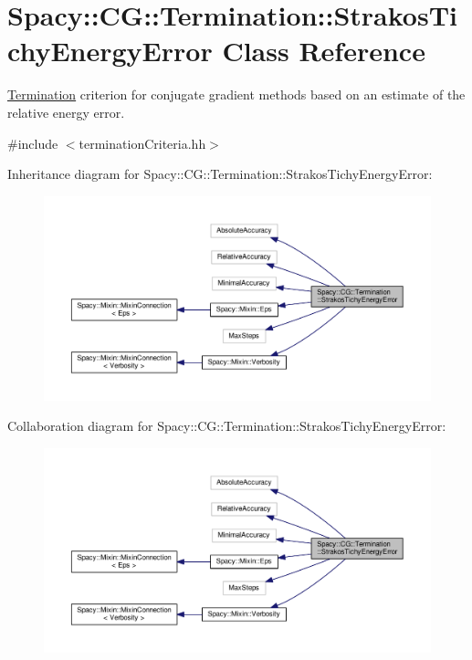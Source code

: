 \hypertarget{classSpacy_1_1CG_1_1Termination_1_1StrakosTichyEnergyError}{\section{Spacy\-:\-:C\-G\-:\-:Termination\-:\-:Strakos\-Tichy\-Energy\-Error Class Reference}
\label{classSpacy_1_1CG_1_1Termination_1_1StrakosTichyEnergyError}
}


\hyperlink{namespaceSpacy_1_1CG_1_1Termination}{Termination} criterion for conjugate gradient methods based on an estimate of the relative energy error.  




{\ttfamily \#include $<$termination\-Criteria.\-hh$>$}



Inheritance diagram for Spacy\-:\-:C\-G\-:\-:Termination\-:\-:Strakos\-Tichy\-Energy\-Error\-:
\nopagebreak
\begin{figure}[H]
\begin{center}
\leavevmode
\includegraphics[width=350pt]{classSpacy_1_1CG_1_1Termination_1_1StrakosTichyEnergyError__inherit__graph}
\end{center}
\end{figure}


Collaboration diagram for Spacy\-:\-:C\-G\-:\-:Termination\-:\-:Strakos\-Tichy\-Energy\-Error\-:
\nopagebreak
\begin{figure}[H]
\begin{center}
\leavevmode
\includegraphics[width=350pt]{classSpacy_1_1CG_1_1Termination_1_1StrakosTichyEnergyError__coll__graph}
\end{center}
\end{figure}
